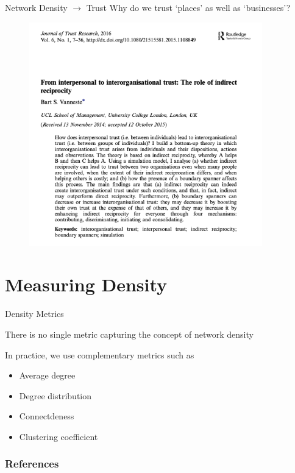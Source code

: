 \documentclass[notes, aspectratio=1610]{beamer}
\begin{document}
\begin{frame}
	{Network Density $\rightarrow$ Trust}
	{Why do we trust `places' as well as `businesses'?}
        \begin{figure}
        	\begin{center}
        		\includegraphics[width=0.9\textwidth]{images/trust_research.png}
        	\end{center}
        \end{figure}
\end{frame}

\section{Measuring Density}

\begin{frame}{Density Metrics}
	\begin{tcolorbox}[
		colback=comp_c!5!white,
		colframe=comp_c!90!black,
		title={\centering !! Pay attention !!}]
		There is no single metric capturing the concept of network density
	\end{tcolorbox}

	\vspace{2em}

	In practice, we use complementary metrics such as 

	\begin{itemize}
		\item Average degree 
		\item Degree distribution 
		\item Connectdeness
		\item Clustering coefficient
	\end{itemize}
\end{frame}

\begin{frame}
	\frametitle{References}
	\printbibliography
 \end{frame} 

\end{document}
